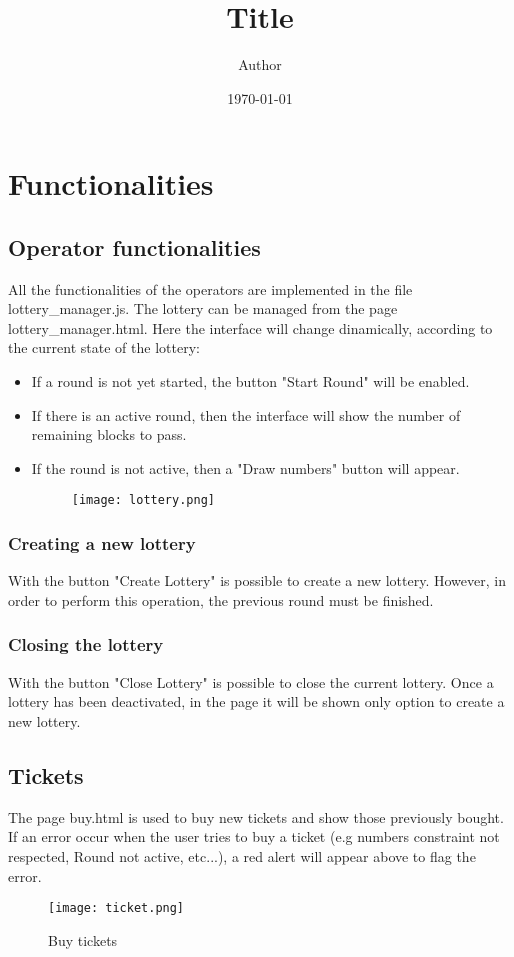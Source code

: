 \documentclass[11pt]{article}
\title{ Title}
\author{ Author }
\date{\today}
\begin{document}
\maketitle	



\section{Functionalities}
\subsection{Operator functionalities}
All the functionalities of the operators are implemented in the file lottery\_manager.js.
The lottery can be managed from the page lottery\_manager.html.
Here the interface will change dinamically, according to the current state of the lottery:
\begin{itemize}

\item If a round is not yet started, the button "Start Round" will be enabled.
\item If there is an active round, then the interface will show the number of remaining blocks to pass.
\item If the round is not active, then a "Draw numbers" button will appear.
\begin{figure}
\texttt{[image: lottery.png]}

\end{figure}
\end{itemize}
\subsubsection*{Creating a new lottery}
With the button "Create Lottery" is possible to create a new lottery. However, in order to perform this operation,
the previous round must be finished.

\subsubsection*{Closing the lottery}
With the button "Close Lottery" is possible to close the current lottery. Once a lottery has been deactivated,
in the page it will be shown only option to create a new lottery.

\subsection{Tickets}
The page buy.html is used to buy new tickets and show those previously bought. If an error occur when the user tries to buy a
ticket (e.g numbers constraint not respected, Round not active, etc...), a red alert will appear above to flag the error.
\begin{figure}[h!]
\centering
\texttt{[image: ticket.png]}
\caption{Buy tickets}
\label{fig:buy}
\end{figure}
\end{document}
